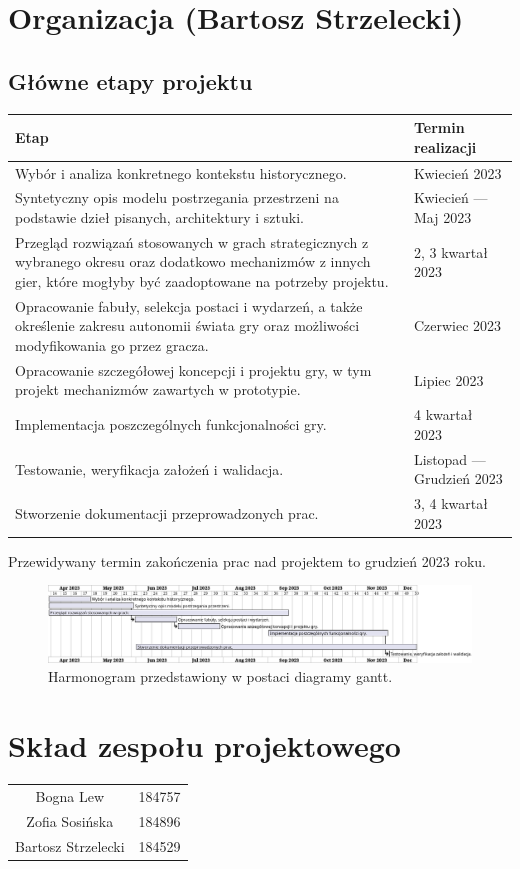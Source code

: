 \section{Organizacja (Bartosz Strzelecki)}
\subsection{Główne etapy projektu}
\begin{center}
  \begin{tabular}{| m{30em}| m{12em}||} 
  \hline
  Etap & Termin realizacji \\
  \hline\hline
  Wybór i analiza konkretnego kontekstu historycznego. & Kwiecień 2023 \\
  \hline
  Syntetyczny opis modelu postrzegania przestrzeni na podstawie dzieł pisanych, architektury i sztuki. & Kwiecień — Maj 2023 \\
  \hline
  Przegląd rozwiązań stosowanych w grach strategicznych z wybranego okresu oraz dodatkowo mechanizmów z innych gier, które mogłyby być zaadoptowane na potrzeby projektu. & 2, 3 kwartał 2023 \\
  \hline
  Opracowanie fabuły, selekcja postaci i wydarzeń, a także określenie zakresu autonomii świata gry oraz możliwości modyfikowania go przez gracza. & Czerwiec 2023 \\
  \hline
  Opracowanie szczegółowej koncepcji i projektu gry, w tym projekt mechanizmów zawartych w prototypie. & Lipiec 2023 \\
  \hline
  Implementacja poszczególnych funkcjonalności gry. & 4 kwartał 2023 \\ 
  \hline
  Testowanie, weryfikacja założeń i walidacja. & Listopad — Grudzień 2023 \\
  \hline
  Stworzenie dokumentacji przeprowadzonych prac. & 3, 4 kwartał 2023 \\
  \hline
\end{tabular}
\end{center}
Przewidywany termin zakończenia prac nad projektem to grudzień 2023 roku.
\begin{figure}[htbp]
    \centering
    \includegraphics[width=1\textwidth]{uml/Harmonogram}
    \caption{Harmonogram przedstawiony w postaci diagramy gantt.}
\end{figure}
\section{Skład zespołu projektowego}
\begin{center}
  \begin{tabular}{ c c }
    Bogna Lew & 184757 \\
    Zofia Sosińska & 184896 \\
    Bartosz Strzelecki & 184529
  \end{tabular}
\end{center}

